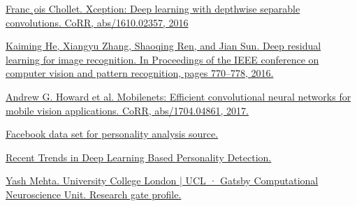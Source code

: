 \begin{thebibliography}{9}
\href{https://arxiv.org/abs/1610.02357}{Franc¸ois Chollet. Xception: Deep learning with depthwise separable convolutions. CoRR, abs/1610.02357, 2016}

\href{https://arxiv.org/pdf/1512.03385.pdf}{Kaiming He, Xiangyu Zhang, Shaoqing Ren, and Jian Sun. Deep residual learning for image recognition. In Proceedings of the IEEE conference on computer vision and pattern recognition, pages 770–778, 2016.}

\href{https://arxiv.org/abs/1704.04861}{Andrew G. Howard et al. Mobilenets: Efficient convolutional neural networks for mobile vision applications. CoRR, abs/1704.04861, 2017.}


\href{https://sites.google.com/michalkosinski.com/mypersonality}{Facebook data set for personality analysis source.}
 
\href{https://paperswithcode.com/paper/recent-trends-in-deep-learning-based/review/?fbclid=IwAR2d33VKI_TmHxP06abC7OzJZYYZ3ahbqdw5kswAxHVC71kJKjhECMvdavk}{Recent Trends in Deep Learning Based Personality Detection.}

\href{https://www.researchgate.net/profile/Yash-Mehta-16}{Yash Mehta. University College London | UCL · Gatsby Computational Neuroscience Unit. Research gate profile.}

\end{thebibliography}